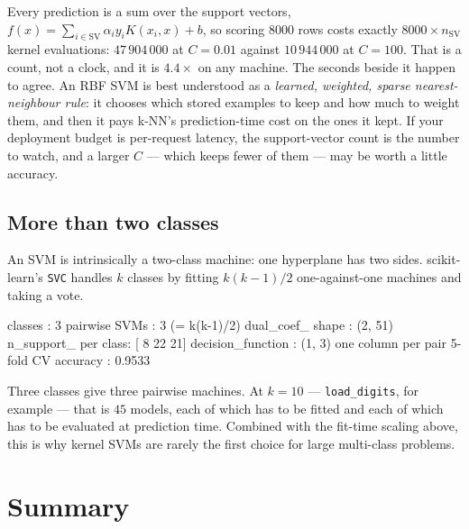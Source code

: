 \documentclass[11pt]{article}
\begin{document}
Every prediction is a sum over the support vectors,
$f(x) = \sum_{i \in \mathrm{SV}} \alpha_i y_i K(x_i, x) + b$, so scoring
$8000$ rows costs exactly $8000 \times n_{\mathrm{SV}}$ kernel evaluations:
$47\,904\,000$ at $C = 0.01$ against $10\,944\,000$ at $C = 100$. That is a
count, not a clock, and it is $4.4\times$ on any machine. The seconds beside
it happen to agree. An RBF
SVM is best understood as a \emph{learned, weighted, sparse nearest-neighbour
rule}: it chooses which stored examples to keep and how much to weight them,
and then it pays k-NN's prediction-time cost on the ones it kept. If your
deployment budget is per-request latency, the support-vector count is the
number to watch, and a larger $C$ --- which keeps fewer of them --- may be
worth a little accuracy.

\subsection{More than two classes}

An SVM is intrinsically a two-class machine: one hyperplane has two sides.
scikit-learn's \texttt{SVC} handles $k$ classes by fitting $k(k-1)/2$
one-against-one machines and taking a vote.

\begin{codeout}
classes            : 3
pairwise SVMs      : 3  (= k(k-1)/2)
dual_coef_ shape   : (2, 51)
n_support_ per class: [ 8 22 21]
decision_function  : (1, 3) one column per pair
5-fold CV accuracy : 0.9533
\end{codeout}

Three classes give three pairwise machines. At $k = 10$ --- \texttt{load\_digits},
for example --- that is $45$ models, each of which has to be fitted and each of
which has to be evaluated at prediction time. Combined with the fit-time
scaling above, this is why kernel SVMs are rarely the first choice for
large multi-class problems.

\section{Summary}
\label{sec:summary}
\end{document}

